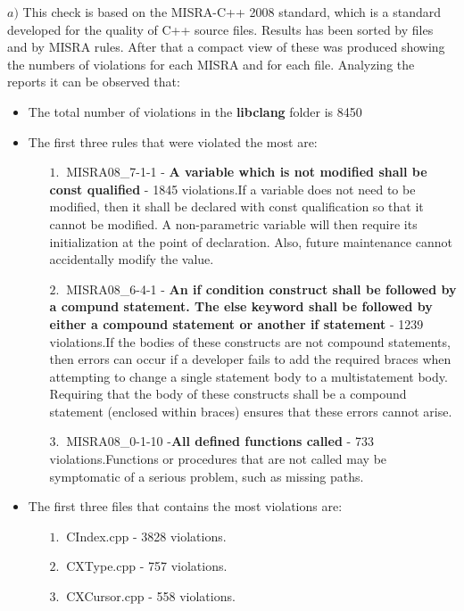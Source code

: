 \hspace{-0.6cm} \textbf{$a)$}  
This check is based on the MISRA-C++ 2008 standard, which is a standard developed for the quality of C++ source files.\newline
Results has been sorted by files and by MISRA rules. After that a compact view of these was produced showing the numbers of violations for each MISRA and for each file.\newline
Analyzing the reports it can be observed that:
\begin{itemize}
	\item The total number of violations in the \textbf{libclang} folder is 8450
	\item The first three rules that were violated the most are:
	\begin{itemize}
		\item[$1.\:$] MISRA08\_7-1-1 - \textbf{A variable which is not modified shall be const qualified} - 1845 violations.\newline If a variable does not need to be modified, then it shall be declared with const qualification so that it cannot be modified. A non-parametric variable will then require its initialization at the point of declaration. Also, future maintenance cannot accidentally modify the value.
		\item[$2.\:$] MISRA08\_6-4-1 - \textbf{An if condition construct shall be followed by a compund statement. The else keyword shall be followed by either a compound statement or another if statement} - 1239 violations.\newline If the bodies of these constructs are not compound statements, then errors can occur if a developer fails to add the required braces when attempting to change a single statement body to a multistatement body.
		Requiring that the body of these constructs shall be a compound statement (enclosed within braces) ensures that these errors cannot arise.
		\item[$3.\:$] MISRA08\_0-1-10 -\textbf{All defined functions called} - 733 violations.\newline Functions or procedures that are not called may be symptomatic of a serious problem, such as missing paths.
	\end{itemize}
	\item The first three files that contains the most violations are:
		\begin{itemize}
		\item[$1.\:$] CIndex.cpp - 3828 violations.
		\item[$2.\:$] CXType.cpp - 757 violations.
		\item[$3.\:$] CXCursor.cpp - 558 violations.
	\end{itemize}
\end{itemize}

